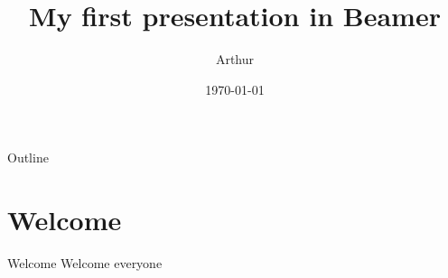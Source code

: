 \documentclass{beamer}
\title{My first presentation in Beamer}
\author{Arthur}
\date{\today}
\begin{document}
    \begin{frame}
        \maketitle
    \end{frame}

    \begin{frame}{Outline}
        \tableofcontents
    \end{frame}

    \section{Welcome}
    \begin{frame}{Welcome}
        Welcome everyone
    \end{frame}
\end{document}
